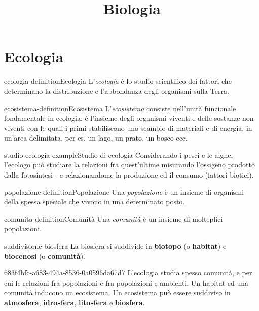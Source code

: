 \documentclass[preview]{standalone}
\begin{document}
\title{Biologia}
\genpage

\section{Ecologia}

\begin{snippetdefinition}{ecologia-definition}{Ecologia}
    L'\textit{ecologia} è lo studio scientifico dei fattori che determinano la
    distribuzione e l'abbondanza degli organismi sulla Terra.
\end{snippetdefinition}

\begin{snippetdefinition}{ecosistema-definition}{Ecosistema}
    L'\textit{ecosistema} consiste nell'unità funzionale fondamentale in ecologia: è
    l'insieme degli organismi viventi e delle sostanze non viventi
    con le quali i primi stabiliscono uno scambio di materiali e di
    energia, in un'area delimitata, per es. un lago, un prato, un
    bosco ecc.
\end{snippetdefinition}


\begin{snippetexample}{studio-ecologia-example}{Studio di ecologia}
    Considerando i pesci e le alghe, l'ecologo può studiare la relazioni fra
    quest'ultime misurando l'ossigeno prodotto dalla fotosintesi - e relazionandome
    la produzione ed il consumo (fattori biotici).
\end{snippetexample}

\begin{snippetdefinition}{popolazione-definition}{Popolazione}
    Una \textit{popolazione} è un insieme di organismi della spessa
    speciale che vivono in una determinato posto.
\end{snippetdefinition}

\begin{snippetdefinition}{comunita-definition}{Comunità}
    Una \textit{comunità} è un insieme di molteplici popolazioni.
\end{snippetdefinition}


\begin{snippet}{suddivisione-biosfera}
    La biosfera si suddivide in \textbf{biotopo} (o \textbf{habitat}) e \textbf{biocenosi} (o \textbf{comunità}).
\end{snippet}

\begin{snippet}{683f4bfc-a683-494a-8536-0a0596da67d7}
    L'ecologia studia spesso comunità, e per cui le relazioni fra popolazioni e fra popolazioni
    e ambienti. Un habitat ed una comunità inducono un ecosistema.
    Un ecosistema può essere suddiviso in \textbf{atmosfera}, \textbf{idrosfera}, \textbf{litosfera}
    e \textbf{biosfera}.
\end{snippet}
\end{document}
